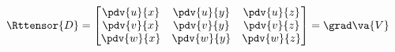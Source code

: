 \begin{equation}
  \Rttensor{D} = \begin{bmatrix}
  \pdv{u}{x} & 
  \pdv{u}{y} & 
  \pdv{u}{z} \\

  \pdv{v}{x} & 
  \pdv{v}{y} & 
  \pdv{v}{z} \\

  \pdv{w}{x} & 
  \pdv{w}{y} & 
  \pdv{w}{z}
  \end{bmatrix} = \grad\va{V}
\end{equation}

